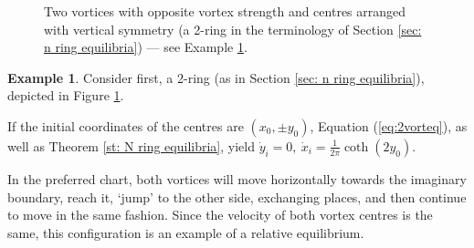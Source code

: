 \documentclass[11pt,twoside]{article}
\theoremstyle{definition}
\newtheorem{Exam}[theorem]{Example}
\numberwithin{equation}{section}
\begin{document}
  \begin{figure} %
\centering
{}
\caption{Two vortices with opposite vortex strength and centres arranged with vertical symmetry (a 2-ring in the terminology of Section \ref{sec: n ring equilibria}) --- see Example \ref{st: exam 1}.}
   \label{fig:eleq}
  \end{figure}
  
\begin{Exam}
    \label{st: exam 1}
      Consider first, a 2-ring (as in  Section \ref{sec: n ring equilibria}), depicted in Figure \ref{fig:eleq}.
      
      
      If the initial coordinates of the centres are $(x_0, \pm y_0)$, Equation (\ref{eq:2vorteq}), as well as Theorem \ref{st: N ring equilibria}, yield  $\dot{y}_i = 0, \ \dot{x}_i= \frac{1}{2\pi }\coth\left(2y_0\right)$.
  
  In the preferred chart, both vortices will move horizontally towards the imaginary boundary, reach it, `jump' to the other side, exchanging places, and then continue to move in the same fashion.  Since the velocity of both vortex centres is the same, this configuration is an example of a relative equilibrium.
  \end{Exam}
  
\end{document}
